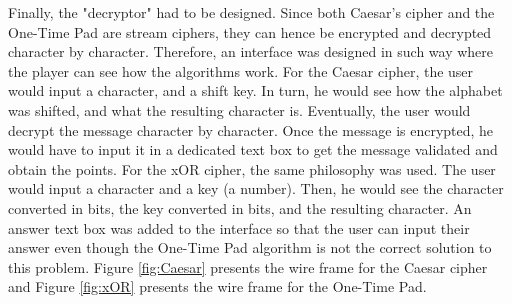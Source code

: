 \documentclass{l4proj}
\begin{document}
Finally, the "decryptor" had to be designed. Since both Caesar's cipher and the One-Time Pad are stream ciphers,
they can hence be encrypted and decrypted character by character. 
Therefore, an interface was designed in such way where the player can see how the algorithms work.
For the Caesar cipher, the user would input a character, and a shift key. 
In turn, he would see how the alphabet was shifted, and what the resulting character is. Eventually,
the user would decrypt the message character by character. 
Once the message is encrypted, he would have to input it in a dedicated text box to get the message validated
and obtain the points. 
For the xOR cipher, the same philosophy was used. The user would input a character and a key (a number).
Then, he would see the character converted in bits, the key converted in bits, and the resulting character.
An answer text box was added to the interface so that the user can input their answer even though
the One-Time Pad algorithm is not the correct solution to this problem. 
Figure \ref{fig:Caesar} presents the wire frame for the Caesar cipher 
and Figure \ref{fig:xOR} presents the wire frame for the One-Time Pad.
\end{document}
